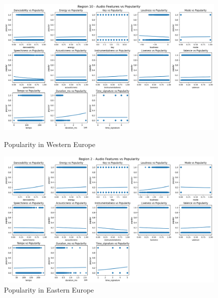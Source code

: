 \begin{figure}[h]
    \begin{minipage}{0.45\textwidth}
        \centering
        \includegraphics[width=\linewidth]{media/region10_cleaned.png}
        \caption{Popularity in Western Europe}
        \label{western_europe}
    \end{minipage}%
    \hspace{0.05\textwidth}
    \begin{minipage}{0.45\textwidth}
        \centering
        \includegraphics[width=\linewidth]{media/region2_cleaned.png}
        \caption{Popularity in Eastern Europe}
        \label{eastern_europe}
    \end{minipage}
    
    \vspace{0.05\textwidth}
    

\end{figure}
